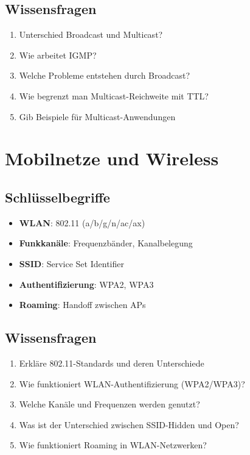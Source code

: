 \documentclass[12pt,a4paper,german]{report}
\begin{document}
\section{Wissensfragen}
\begin{enumerate}
    \item Unterschied Broadcast und Multicast?
    \item Wie arbeitet IGMP?
    \item Welche Probleme entstehen durch Broadcast?
    \item Wie begrenzt man Multicast-Reichweite mit TTL?
    \item Gib Beispiele für Multicast-Anwendungen
\end{enumerate}

\chapter{Mobilnetze und Wireless}

\section{Schlüsselbegriffe}
\begin{itemize}
    \item \textbf{WLAN}: 802.11 (a/b/g/n/ac/ax)
    \item \textbf{Funkkanäle}: Frequenzbänder, Kanalbelegung
    \item \textbf{SSID}: Service Set Identifier
    \item \textbf{Authentifizierung}: WPA2, WPA3
    \item \textbf{Roaming}: Handoff zwischen APs
\end{itemize}

\section{Wissensfragen}
\begin{enumerate}
    \item Erkläre 802.11-Standards und deren Unterschiede
    \item Wie funktioniert WLAN-Authentifizierung (WPA2/WPA3)?
    \item Welche Kanäle und Frequenzen werden genutzt?
    \item Was ist der Unterschied zwischen SSID-Hidden und Open?
    \item Wie funktioniert Roaming in WLAN-Netzwerken?
\end{enumerate}
\end{document}

